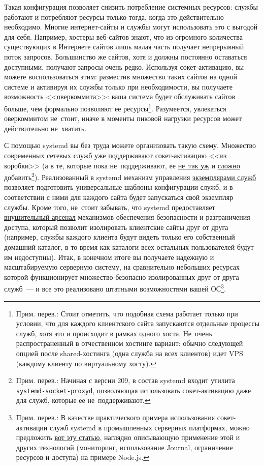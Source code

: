 \documentclass[10pt,oneside,a4paper]{article}
\newcommand{\hreftt}[2]{\href{#1}{\texttt{#2}}}
\begin{document}
Такая конфигурация позволяет снизить потребление системных ресурсов: службы
работают и потребляют ресурсы только тогда, когда это действительно необходимо.
Многие интернет-сайты и службы могут использовать это с выгодой для себя.
Например, хостеры веб-сайтов знают, что из огромного количества существующих в
Интернете сайтов лишь малая часть получает непрерывный поток запросов.
Большинство же сайтов, хотя и должны постоянно оставаться доступными, получают
запросы очень редко. Используя сокет-активацию, вы можете воспользоваться этим:
разместив множество таких сайтов на одной системе и активируя их службы только
при необходимости, вы получаете возможность <<оверкоммита>>: ваша система будет
обслуживать сайтов больше, чем формально позволяют ее ресурсы\footnote{Прим.
перев.: Стоит отметить, что подобная схема работает только при условии, что для
каждого клиентского сайта запускаются отдельные процессы служб, хотя это и
происходит в рамках одного хоста. Не~очень распространенный в отчественном
хостинге вариант: обычно следующей опцией после shared-хостинга (одна служба на
всех клиентов) идет VPS (каждому клиенту по виртуальному хосту).}. Разумеется,
увлекаться оверкоммитом не~стоит, иначе в моменты пиковой нагрузки ресурсов
может действительно не~хватить.

С помощью systemd вы без труда можете организовать такую схему. Множество
современных сетевых служб уже поддерживают сокет-активацию <<из коробки>> (а в
те, которые пока не~поддерживают, ее
\href{http://0pointer.de/blog/projects/socket-activation.html}{не~так уж} и
\href{http://0pointer.de/blog/projects/socket-activation2.html}{сложно}
добавить\footnote{Прим. перев.: Начиная с версии 209, в состав systemd входит
утилита
\hreftt{http://www.freedesktop.org/software/systemd/man/systemd-socket-proxyd.html}%
{systemd-socket-proxyd}, позволяющая использовать сокет-активацию даже для
служб, которые ее не~поддерживают.}). Реализованный в systemd механизм управления
\hyperref[sec:instances]{экземплярами служб} позволяет  подготовить
универсальные шаблоны конфигурации служб, и в соответствии с ними для каждого
сайта будет запускаться свой экземпляр службы. Кроме того, не~стоит забывать,
что systemd предоставляет \hyperref[sec:security]{внушительный арсенал}
механизмов обеспечения безопасности и разграничения доступа, который позволит
изолировать клиентские сайты друг от друга (например, службы каждого клиента
будут видеть только его собственный домашний каталог, в то время как каталоги
всех остальных пользователей будут им недоступны). Итак, в конечном итоге вы
получаете надежную и масштабируемую серверную систему, на сравнительно небольших
ресурсах которой функционирует множество безопасно изолированных друг от друга
служб~--- и все это реализовано штатными возможностями вашей ОС\footnote{Прим.
перев.: В качестве практического примера использования сокет-активации служб
systemd в промышленных серверных платформах, можно предложить
\href{http://savanne.be/articles/deploying-node-js-with-systemd/}{вот эту
статью}, наглядно описывающую применение этой и других технологий (мониторинг,
использование Journal, ограничение ресурсов и доступа) на примере Node.js.}.
\end{document}
